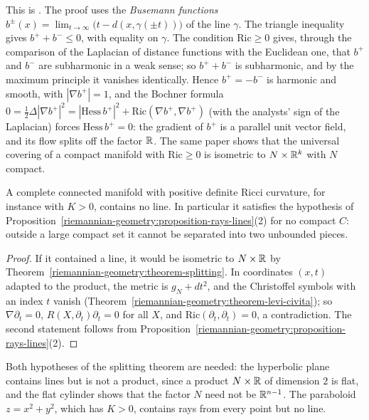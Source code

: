 This is \cite{cheeger-gromoll-1971}. The proof uses the \emph{Busemann functions} $b^\pm(x) = \lim_{t \to \infty}\bigl(t - d(x, \gamma(\pm t))\bigr)$ of the line $\gamma$. The
triangle inequality gives $b^+ + b^- \leq 0$, with equality on $\gamma$. The condition $\mathrm{Ric} \geq 0$ gives, through the comparison of the Laplacian of distance functions
with the Euclidean one, that $b^+$ and $b^-$ are subharmonic in a weak sense; so $b^+ + b^-$ is subharmonic, and by the maximum principle it vanishes identically. Hence
$b^+ = -b^-$ is harmonic and smooth, with $|\nabla b^+| = 1$, and the Bochner formula $0 = \frac12\Delta|\nabla b^+|^2 = |\mathrm{Hess}\,b^+|^2 + \mathrm{Ric}(\nabla b^+, \nabla b^+)$
(with the analysts' sign of the Laplacian) forces $\mathrm{Hess}\,b^+ = 0$: the gradient of $b^+$ is a parallel unit vector field, and its flow splits off the factor $\mathbb{R}$.
The same paper shows that the universal covering of a compact manifold with $\mathrm{Ric} \geq 0$ is isometric to $N \times \mathbb{R}^k$ with $N$ compact.

\begin{corollary}\label{riemannian-geometry:corollary-no-lines}
A complete connected manifold with positive definite Ricci curvature, for instance with $K > 0$, contains no line. In particular it satisfies the hypothesis of
Proposition~\ref{riemannian-geometry:proposition-rays-lines}(2) for no compact $C$: outside a large compact set it cannot be separated into two unbounded pieces.
\end{corollary}

\begin{proof}
If it contained a line, it would be isometric to $N \times \mathbb{R}$ by Theorem~\ref{riemannian-geometry:theorem-splitting}. In coordinates $(x, t)$ adapted to the product, the
metric is $g_N + dt^2$, and the Christoffel symbols with an index $t$ vanish (Theorem~\ref{riemannian-geometry:theorem-levi-civita}); so $\nabla\partial_t = 0$,
$R(X, \partial_t)\partial_t = 0$ for all $X$, and $\mathrm{Ric}(\partial_t, \partial_t) = 0$, a contradiction. The second statement follows from
Proposition~\ref{riemannian-geometry:proposition-rays-lines}(2).
\end{proof}

Both hypotheses of the splitting theorem are needed: the hyperbolic plane contains lines but is not a product, since a product $N \times \mathbb{R}$ of dimension $2$ is flat, and
the flat cylinder shows that the factor $N$ need not be $\mathbb{R}^{n-1}$. The paraboloid $z = x^2 + y^2$, which has $K > 0$, contains rays from every point but no line.

